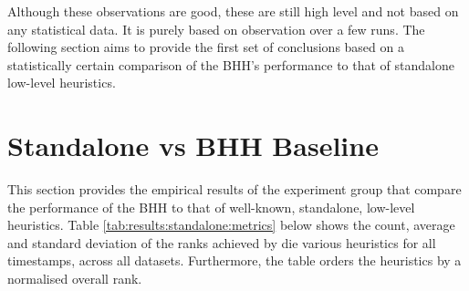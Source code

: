 Although these observations are good, these are still high level and not based on any statistical data. It is purely based on observation over a few runs. The following section aims to provide the first set of conclusions based on a statistically certain comparison of the \Ac{BHH}'s performance to that of standalone low-level heuristics.


\section{Standalone vs BHH Baseline}
\label{sec:results:standalone}

This section provides the empirical results of the experiment group that compare the performance of the \Ac{BHH} to that of well-known, standalone, low-level heuristics. Table \ref{tab:results:standalone:metrics} below shows the count, average and standard deviation of the ranks achieved by die various heuristics for all timestamps, across all datasets. Furthermore, the table orders the heuristics by a normalised overall rank.

